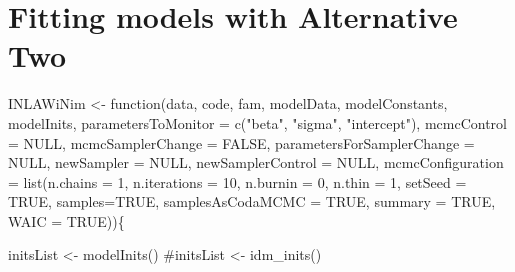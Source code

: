 \documentclass[
]{article}
\newenvironment{Shaded}{\begin{snugshade}}{\end{snugshade}}
\newcommand{\AttributeTok}[1]{\textcolor[rgb]{0.40,0.45,0.13}{#1}}
\newcommand{\CommentTok}[1]{\textcolor[rgb]{0.37,0.37,0.37}{#1}}
\newcommand{\ConstantTok}[1]{\textcolor[rgb]{0.56,0.35,0.01}{#1}}
\newcommand{\ControlFlowTok}[1]{\textcolor[rgb]{0.00,0.23,0.31}{#1}}
\newcommand{\DecValTok}[1]{\textcolor[rgb]{0.68,0.00,0.00}{#1}}
\newcommand{\FunctionTok}[1]{\textcolor[rgb]{0.28,0.35,0.67}{#1}}
\newcommand{\NormalTok}[1]{\textcolor[rgb]{0.00,0.23,0.31}{#1}}
\newcommand{\OtherTok}[1]{\textcolor[rgb]{0.00,0.23,0.31}{#1}}
\newcommand{\StringTok}[1]{\textcolor[rgb]{0.13,0.47,0.30}{#1}}
\begin{document}
\hypertarget{fitting-models-with-alternative-two}{%
\section{Fitting models with Alternative
Two}\label{fitting-models-with-alternative-two}}

\begin{Shaded}
\begin{Highlighting}[]
\NormalTok{INLAWiNim }\OtherTok{\textless{}{-}} \ControlFlowTok{function}\NormalTok{(data,}
\NormalTok{                      code,}
\NormalTok{                      fam,}
\NormalTok{                      modelData,}
\NormalTok{                      modelConstants,}
\NormalTok{                      modelInits,}
                      \AttributeTok{parametersToMonitor =} \FunctionTok{c}\NormalTok{(}\StringTok{"beta"}\NormalTok{, }\StringTok{"sigma"}\NormalTok{, }\StringTok{"intercept"}\NormalTok{),}
                      \AttributeTok{mcmcControl =} \ConstantTok{NULL}\NormalTok{,}
                      \AttributeTok{mcmcSamplerChange =} \ConstantTok{FALSE}\NormalTok{,}
                      \AttributeTok{parametersForSamplerChange =} \ConstantTok{NULL}\NormalTok{,}
                      \AttributeTok{newSampler =} \ConstantTok{NULL}\NormalTok{,}
                      \AttributeTok{newSamplerControl =} \ConstantTok{NULL}\NormalTok{,}
                      \AttributeTok{mcmcConfiguration =} \FunctionTok{list}\NormalTok{(}\AttributeTok{n.chains =} \DecValTok{1}\NormalTok{,}
                                               \AttributeTok{n.iterations =} \DecValTok{10}\NormalTok{,}
                                               \AttributeTok{n.burnin =} \DecValTok{0}\NormalTok{,}
                                               \AttributeTok{n.thin =} \DecValTok{1}\NormalTok{,}
                                               \AttributeTok{setSeed =} \ConstantTok{TRUE}\NormalTok{,}
                                               \AttributeTok{samples=}\ConstantTok{TRUE}\NormalTok{,}
                                               \AttributeTok{samplesAsCodaMCMC =} \ConstantTok{TRUE}\NormalTok{,}
                                               \AttributeTok{summary =} \ConstantTok{TRUE}\NormalTok{,}
                                               \AttributeTok{WAIC =} \ConstantTok{TRUE}\NormalTok{))\{}




\NormalTok{  initsList }\OtherTok{\textless{}{-}} \FunctionTok{modelInits}\NormalTok{()}
  \CommentTok{\#initsList \textless{}{-} idm\_inits()}



\end{Highlighting}
\end{Shaded}
\end{document}

